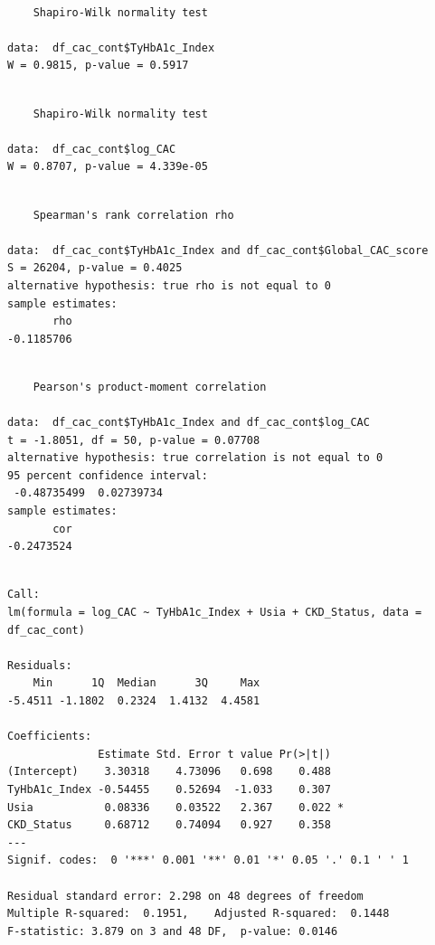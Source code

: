 \documentclass[
  indonesian,
]{agujournal2019}
\begin{document}
\begin{verbatim}

    Shapiro-Wilk normality test

data:  df_cac_cont$TyHbA1c_Index
W = 0.9815, p-value = 0.5917
\end{verbatim}

\begin{verbatim}

    Shapiro-Wilk normality test

data:  df_cac_cont$log_CAC
W = 0.8707, p-value = 4.339e-05
\end{verbatim}

\begin{verbatim}

    Spearman's rank correlation rho

data:  df_cac_cont$TyHbA1c_Index and df_cac_cont$Global_CAC_score
S = 26204, p-value = 0.4025
alternative hypothesis: true rho is not equal to 0
sample estimates:
       rho 
-0.1185706 
\end{verbatim}

\begin{verbatim}

    Pearson's product-moment correlation

data:  df_cac_cont$TyHbA1c_Index and df_cac_cont$log_CAC
t = -1.8051, df = 50, p-value = 0.07708
alternative hypothesis: true correlation is not equal to 0
95 percent confidence interval:
 -0.48735499  0.02739734
sample estimates:
       cor 
-0.2473524 
\end{verbatim}

\begin{verbatim}

Call:
lm(formula = log_CAC ~ TyHbA1c_Index + Usia + CKD_Status, data = df_cac_cont)

Residuals:
    Min      1Q  Median      3Q     Max 
-5.4511 -1.1802  0.2324  1.4132  4.4581 

Coefficients:
              Estimate Std. Error t value Pr(>|t|)  
(Intercept)    3.30318    4.73096   0.698    0.488  
TyHbA1c_Index -0.54455    0.52694  -1.033    0.307  
Usia           0.08336    0.03522   2.367    0.022 *
CKD_Status     0.68712    0.74094   0.927    0.358  
---
Signif. codes:  0 '***' 0.001 '**' 0.01 '*' 0.05 '.' 0.1 ' ' 1

Residual standard error: 2.298 on 48 degrees of freedom
Multiple R-squared:  0.1951,    Adjusted R-squared:  0.1448 
F-statistic: 3.879 on 3 and 48 DF,  p-value: 0.0146
\end{verbatim}
\end{document}
